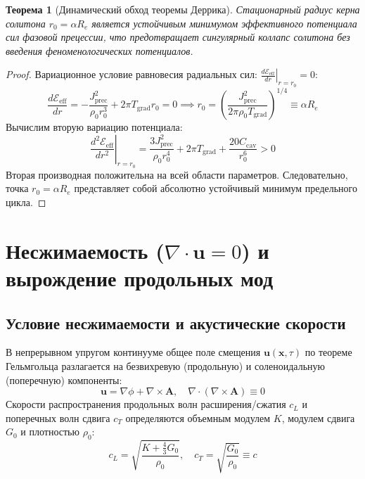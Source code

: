 \documentclass[12pt,a4paper]{article}
\newtheorem{theorem}{Теорема}
\begin{document}
	\begin{theorem}[Динамический обход теоремы Деррика]
		Стационарный радиус керна солитона $r_0 = \alpha R_e$ является устойчивым минимумом эффективного потенциала сил фазовой прецессии, что предотвращает сингулярный коллапс солитона без введения феноменологических потенциалов.
	\end{theorem}
	
	\begin{proof}
		Вариационное условие равновесия радиальных сил: $\left. \frac{d\mathcal{E}_{\text{eff}}}{dr} \right|_{r=r_0} = 0$:
		\begin{equation}
			\frac{d\mathcal{E}_{\text{eff}}}{dr} = -\frac{J_{\text{prec}}^2}{\rho_0 r_0^3} + 2\pi T_{\text{grad}} r_0 = 0 \implies r_0 = \left( \frac{J_{\text{prec}}^2}{2\pi \rho_0 T_{\text{grad}}} \right)^{1/4} \equiv \alpha R_e
		\end{equation}
		Вычислим вторую вариацию потенциала:
		\begin{equation}
			\left. \frac{d^2\mathcal{E}_{\text{eff}}}{dr^2} \right|_{r=r_0} = \frac{3 J_{\text{prec}}^2}{\rho_0 r_0^4} + 2\pi T_{\text{grad}} + \frac{20 C_{\text{cav}}}{r_0^6} > 0
		\end{equation}
		Вторая производная положительна на всей области параметров. Следовательно, точка $r_0 = \alpha R_e$ представляет собой абсолютно устойчивый минимум предельного цикла.
	\end{proof}
	
	\section{Несжимаемость ($\nabla \cdot \mathbf{u} = 0$) и вырождение продольных мод}
	
	\subsection{Условие несжимаемости и акустические скорости}
	В непрерывном упругом континууме общее поле смещения $\mathbf{u}(\mathbf{x}, \tau)$ по теореме Гельмгольца разлагается на безвихревую (продольную) и соленоидальную (поперечную) компоненты:
	\begin{equation}
		\mathbf{u} = \nabla \phi + \nabla \times \mathbf{A}, \quad \nabla \cdot (\nabla \times \mathbf{A}) \equiv 0
	\end{equation}
	Скорости распространения продольных волн расширения/сжатия $c_L$ и поперечных волн сдвига $c_T$ определяются объемным модулем $K$, модулем сдвига $G_0$ и плотностью $\rho_0$:
	\begin{equation}
		c_L = \sqrt{\frac{K + \frac{4}{3}G_0}{\rho_0}}, \quad c_T = \sqrt{\frac{G_0}{\rho_0}} \equiv c
	\end{equation}
	
\end{document}
